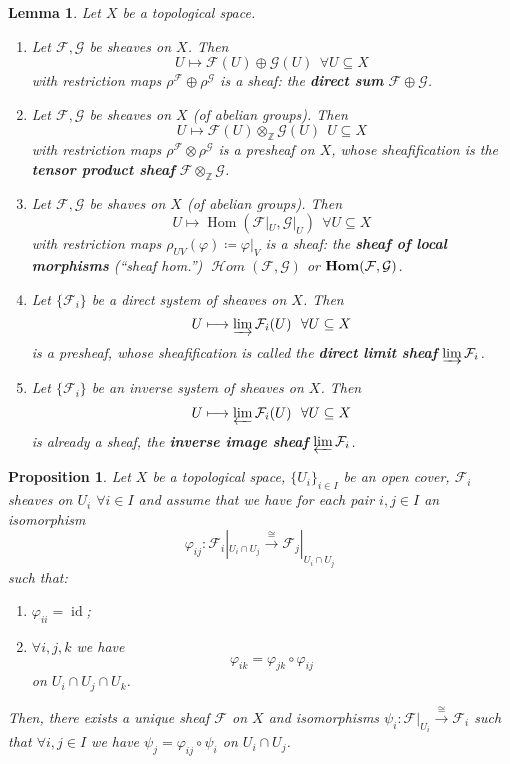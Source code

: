 \documentclass[12pt]{article}
\DeclareMathOperator{\id}{id}
\DeclareMathOperator{\Hom}{Hom}
\DeclareMathOperator{\shHom}{\mathcal{H}\textit{om}}
\DeclareMathOperator{\HOM}{\textnormal{\textbf{Hom}}}
\newtheorem*{proposition}{Proposition}
\newtheorem*{lemma}{Lemma}
\theoremstyle{definition}
\begin{document}
\begin{lemma}
Let $X$ be a topological space.

\begin{enumerate}[label=\arabic*)]
\item Let $\mathcal{F},\mathcal{G}$ be sheaves on $X$. Then
\[U\longmapsto\mathcal{F}(U)\oplus\mathcal{G}(U)\ \ \forall U\subseteq X\]
with restriction maps $\rho^{\mathcal{F}}\oplus\rho^{\mathcal{G}}$ is a sheaf: the \textbf{direct sum} $\mathcal{F}\oplus\mathcal{G}$.

\item Let $\mathcal{F},\mathcal{G}$ be sheaves on $X$ (of abelian groups). Then
\[U\longmapsto\mathcal{F}(U)\otimes_{\mathbb{Z}}\mathcal{G}(U)\ \ U\subseteq X\]
with restriction maps $\rho^{\mathcal{F}}\otimes\rho^{\mathcal{G}}$ is a presheaf on $X$, whose sheafification is the \textbf{tensor product sheaf} $\mathcal{F}\otimes_{\mathbb{Z}}\mathcal{G}$.

\item Let $\mathcal{F},\mathcal{G}$ be shaves on $X$ (of abelian groups). Then
\[U\longmapsto\Hom(\mathcal{F}|_U,\mathcal{G}|_U)\ \ \forall U\subseteq X\]
with restriction maps $\rho_{UV}(\varphi)\coloneqq\varphi|_V$ is a sheaf: the \textbf{sheaf of local morphisms} (``sheaf hom.'') $\shHom(\mathcal{F},\mathcal{G})$ or $\HOM(\mathcal{F},\mathcal{G})$.

\item Let $\{\mathcal{F}_i\}$ be a direct system of sheaves on $X$. Then
\[U\longmapsto\varinjlim\mathcal{F}_i(U)\ \ \forall U\subseteq X\]
is a presheaf, whose sheafification is called the \textbf{direct limit sheaf} $\varinjlim\mathcal{F}_i$.

\item Let $\{\mathcal{F}_i\}$ be an inverse system of sheaves on $X$. Then
\[U\longmapsto\varprojlim\mathcal{F}_i(U)\ \ \forall U\subseteq X\]
is already a sheaf, the \textbf{inverse image sheaf} $\varprojlim\mathcal{F}_i$.
\end{enumerate}
\end{lemma}

\begin{proposition}
Let $X$ be a topological space, $\{U_i\}_{i\in I}$ be an open cover, $\mathcal{F}_i$ sheaves on $U_i$ $\forall i\in I$ and assume that we have for each pair $i,j\in I$ an isomorphism
\[\varphi_{ij}:\mathcal{F}_i|_{U_i\cap U_j}\overset{\cong}{\longrightarrow}\mathcal{F}_j|_{U_i\cap U_j}\]
such that:
\begin{enumerate}[label=\arabic*)]
\item $\varphi_{ii}=\id$;
\item $\forall i,j,k$ we have
\[\varphi_{ik}=\varphi_{jk}\circ\varphi_{ij}\]
on $U_i\cap U_j\cap U_k$.
\end{enumerate}

Then, there exists a unique sheaf $\mathcal{F}$ on $X$ and isomorphisms $\psi_i:\mathcal{F}|_{U_i}\xrightarrow{\cong}\mathcal{F}_i$ such that $\forall i,j\in I$ we have $\psi_j=\varphi_{ij}\circ\psi_i$ on $U_i\cap U_j$.
\end{proposition}
\end{document}
